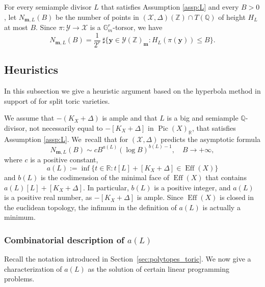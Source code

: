 \documentclass[JEP,XML,SOM,Unicode,published]{cedram}
\newcommand{\bfy}{\boldsymbol{y}}
\newcommand{\bfm}{{\boldsymbol{m}}}
\newcommand\ZZ{\mathbb{Z}}
\newcommand\RR{\mathbb{R}}
\newcommand\QQ{\mathbb{Q}}
\newcommand\GG{\mathbb{G}}
\DeclareMathOperator{\pic}{Pic}
\DeclareMathOperator{\eff}{Eff}
\theoremstyle{definition}
\numberwithin{theorem}{section}
\begin{document}
For every semiample divisor $L$ that satisfies Assumption \ref{assp:L} and every $B>0$, let
$N_{\bfm, L}(B)$ be the number of points in $(\mathscr{X},\Delta)(\ZZ)\cap T(\QQ)$
of height $H_L$ at most $B$.
Since $\pi:\mathscr Y\to\mathscr X$ is a $\GG_m^r$-torsor, we have
\[
N_{\bfm,L}(B)=\frac 1{2^r}\ \sharp\{\bfy\in\mathscr{Y}(\ZZ)_{\bfm}: H_L(\pi(\bfy))\leq B\}.
\]

\subsection{Heuristics}
\label{sec:heuristics}
In this subsection we give a heuristic argument based on the hyperbola method
in support of \cite[Conj.\,1.1]{PSTVA} for split toric varieties.

We assume that $-(K_X+\Delta)$ is ample and that $L$ is a big and semiample $\mathbb Q$-divisor,
not necessarily equal to $-[K_X+\Delta]$ in $\pic(X)_{\RR}$, that satisfies Assumption \ref{assp:L}.
We~recall that \cite[Conj.\,1.1]{PSTVA} for $(\mathscr X,\Delta)$ predicts the asymptotic formula
\begin{equation}
\label{eq:conjecture}
N_{\bfm,L}(B)\sim c B^{a(L)}(\log B)^{b(L)-1}, \quad B\to+\infty,
\end{equation}
where $c$ is a positive constant,
\begin{equation}
a(L):=\inf\{t\in \RR: t[L]+[K_X+\Delta] \in \eff(X)\}
\end{equation}
and $b(L)$ is the codimension of the minimal face of $\eff(X)$ that contains
$a(L)[L]+[K_X+\Delta]$.
In particular, $b(L)$ is a positive integer, and $a(L)$ is a positive real number, as $-[K_X+\Delta]$ is ample. Since $\eff(X)$ is closed in the euclidean topology, the infimum in
the definition of $a(L)$ is actually a minimum.

\subsubsection{Combinatorial description of $a(L)$}
\label{sec:combinatorial_description_a}

Recall the notation introduced in Section~\ref{sec:polytopes_toric}.
We now give a characterization of $a(L)$ as the solution of certain linear programming problems.
\end{document}
